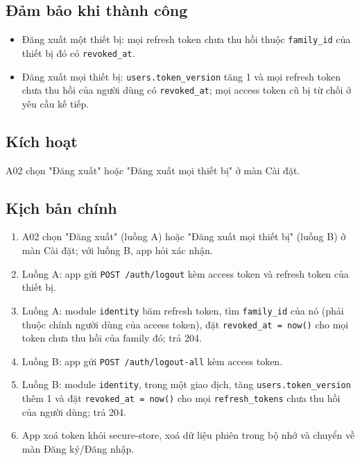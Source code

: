 \subsection{Đảm bảo khi thành công}
\begin{itemize}
\item Đăng xuất một thiết bị: mọi refresh token chưa thu hồi thuộc {\small\texttt{family\_\allowbreak{}\allowbreak{}id}} của thiết bị đó có {\small\texttt{revoked\_\allowbreak{}\allowbreak{}at}}.
\item Đăng xuất mọi thiết bị: {\small\texttt{users.\allowbreak{}token\_\allowbreak{}\allowbreak{}version}} tăng 1 và mọi refresh token chưa thu hồi của người dùng có {\small\texttt{revoked\_\allowbreak{}\allowbreak{}at}}; mọi access token cũ bị từ chối ở yêu cầu kế tiếp.
\end{itemize}
\subsection{Kích hoạt}
A02 chọn "Đăng xuất" hoặc "Đăng xuất mọi thiết bị" ở màn Cài đặt.

\subsection{Kịch bản chính}
\begin{enumerate}
\item A02 chọn "Đăng xuất" (luồng A) hoặc "Đăng xuất mọi thiết bị" (luồng B) ở màn Cài đặt; với luồng B, app hỏi xác nhận.
\item Luồng A: app gửi {\small\texttt{POST /\allowbreak{}\allowbreak{}auth/\allowbreak{}\allowbreak{}logout}} kèm access token và refresh token của thiết bị.
\item Luồng A: module {\small\texttt{identity}} băm refresh token, tìm {\small\texttt{family\_\allowbreak{}\allowbreak{}id}} của nó (phải thuộc chính người dùng của access token), đặt {\small\texttt{revoked\_\allowbreak{}\allowbreak{}at = now()}} cho mọi token chưa thu hồi của family đó; trả 204.
\item Luồng B: app gửi {\small\texttt{POST /\allowbreak{}\allowbreak{}auth/\allowbreak{}\allowbreak{}logout-\allowbreak{}all}} kèm access token.
\item Luồng B: module {\small\texttt{identity}}, trong một giao dịch, tăng {\small\texttt{users.\allowbreak{}token\_\allowbreak{}\allowbreak{}version}} thêm 1 và đặt {\small\texttt{revoked\_\allowbreak{}\allowbreak{}at = now()}} cho mọi {\small\texttt{refresh\_\allowbreak{}\allowbreak{}tokens}} chưa thu hồi của người dùng; trả 204.
\item App xoá token khỏi secure-\allowbreak{}store, xoá dữ liệu phiên trong bộ nhớ và chuyển về màn Đăng ký/\allowbreak{}Đăng nhập.
\end{enumerate}
